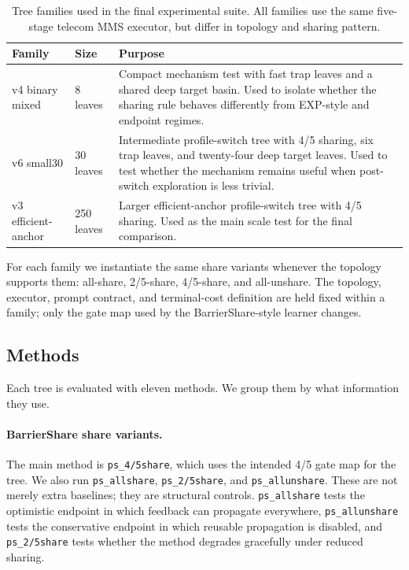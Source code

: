 \begin{table}[t]
    \centering
    \small
    \caption{Tree families used in the final experimental suite. All families use the same five-stage telecom MMS executor, but differ in topology and sharing pattern.}
    \label{tab:tree_families}
    \begin{tabular}{llp{7.1cm}}
        \toprule
        Family & Size & Purpose \\
        \midrule
        v4 binary mixed & 8 leaves & Compact mechanism test with fast trap leaves and a shared deep target basin. Used to isolate whether the sharing rule behaves differently from EXP-style and endpoint regimes. \\
        v6 small30 & 30 leaves & Intermediate profile-switch tree with 4/5 sharing, six trap leaves, and twenty-four deep target leaves. Used to test whether the mechanism remains useful when post-switch exploration is less trivial. \\
        v3 efficient-anchor & 250 leaves & Larger efficient-anchor profile-switch tree with 4/5 sharing. Used as the main scale test for the final comparison. \\
        \bottomrule
    \end{tabular}
\end{table}

For each family we instantiate the same share variants whenever the topology supports them:
all-share, 2/5-share, 4/5-share, and all-unshare. The topology, executor, prompt contract, and terminal-cost definition are held fixed within a family; only the gate map used by the BarrierShare-style learner changes.

\subsection{Methods}
\label{sec:exp_methods}

Each tree is evaluated with eleven methods. We group them by what information they use.

\paragraph{BarrierShare share variants.}
The main method is \texttt{ps\_4/5share}, which uses the intended 4/5 gate map for the tree. We also run \texttt{ps\_allshare}, \texttt{ps\_2/5share}, and \texttt{ps\_allunshare}. These are not merely extra baselines; they are structural controls. \texttt{ps\_allshare} tests the optimistic endpoint in which feedback can propagate everywhere, \texttt{ps\_allunshare} tests the conservative endpoint in which reusable propagation is disabled, and \texttt{ps\_2/5share} tests whether the method degrades gracefully under reduced sharing.

